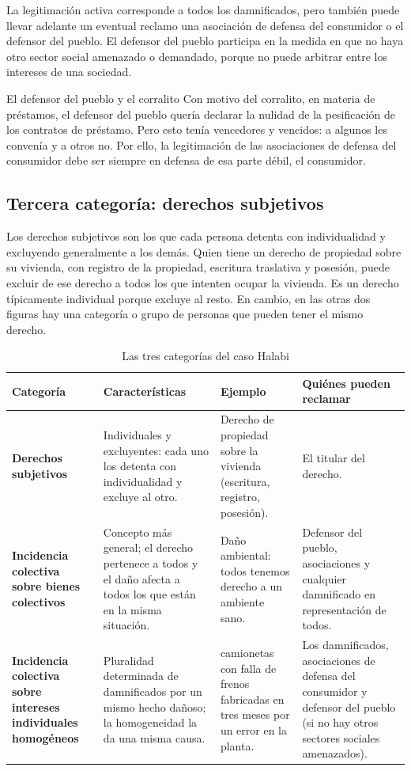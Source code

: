 \documentclass[12pt,oneside]{book}
\begin{document}
La legitimación activa corresponde a todos los damnificados, pero también puede llevar adelante un eventual reclamo una asociación de defensa del consumidor o el defensor del pueblo. El defensor del pueblo participa en la medida en que no haya otro sector social amenazado o demandado, porque no puede arbitrar entre los intereses de una sociedad.

\begin{example}{El defensor del pueblo y el corralito}
Con motivo del corralito, en materia de préstamos, el defensor del pueblo quería declarar la nulidad de la pesificación de los contratos de préstamo. Pero esto tenía vencedores y vencidos: a algunos les convenía y a otros no. Por ello, la legitimación de las asociaciones de defensa del consumidor debe ser siempre en defensa de esa parte débil, el consumidor.
\end{example}

\subsection{Tercera categoría: derechos subjetivos}

Los derechos subjetivos son los que cada persona detenta con individualidad y excluyendo generalmente a los demás. Quien tiene un derecho de propiedad sobre su vivienda, con registro de la propiedad, escritura traslativa y posesión, puede excluir de ese derecho a todos los que intenten ocupar la vivienda. Es un derecho típicamente individual porque excluye al resto. En cambio, en las otras dos figuras hay una categoría o grupo de personas que pueden tener el mismo derecho.

\begin{table}[H]
\centering
\small
\caption{Las tres categorías del caso Halabi}
\begin{tabularx}{\textwidth}{>{\raggedright\arraybackslash\bfseries}p{2.7cm} >{\raggedright\arraybackslash}X >{\raggedright\arraybackslash}p{2.9cm} >{\raggedright\arraybackslash}p{2.9cm}}
\toprule
Categoría & Características & Ejemplo & Quiénes pueden reclamar \\
\midrule
Derechos subjetivos & Individuales y excluyentes: cada uno los detenta con individualidad y excluye al otro. & Derecho de propiedad sobre la vivienda (escritura, registro, posesión). & El titular del derecho. \\
Incidencia colectiva sobre bienes colectivos & Concepto más general; el derecho pertenece a todos y el daño afecta a todos los que están en la misma situación. & Daño ambiental: todos tenemos derecho a un ambiente sano. & Defensor del pueblo, asociaciones y cualquier damnificado en representación de todos. \\
Incidencia colectiva sobre intereses individuales homogéneos & Pluralidad determinada de damnificados por un mismo hecho dañoso; la homogeneidad la da una misma causa. & 25.000 camionetas con falla de frenos fabricadas en tres meses por un error en la planta. & Los damnificados, asociaciones de defensa del consumidor y defensor del pueblo (si no hay otros sectores sociales amenazados). \\
\bottomrule
\end{tabularx}
\end{table}
\end{document}
